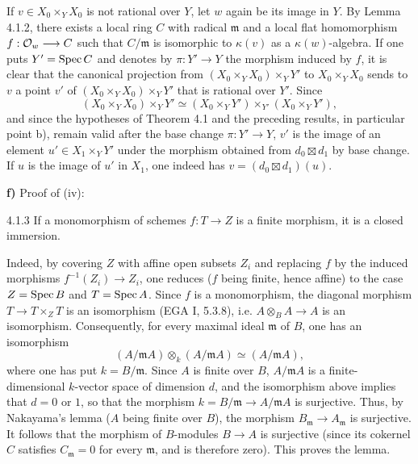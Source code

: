 If $v\in X_0\times_YX_0$ is not rational over $Y$, let $w$ again be its image in $Y$. By Lemma 4.1.2, there exists a local ring $C$ with radical $\mathfrak m$ and a local flat homomorphism $f:\mathcal{O}_w\longrightarrow C$ such that $C/\mathfrak m$ is isomorphic to $\kappa(v)$ as a $\kappa(w)$-algebra. If one puts $Y'=\operatorname{Spec} C$ and denotes by $\pi:Y'\to Y$ the morphism induced by $f$, it is clear that the canonical projection from $(X_0\times_YX_0)\times_YY'$ to $X_0\times_YX_0$ sends to $v$ a point $v'$ of $(X_0\times_YX_0)\times_YY'$ that is rational over $Y'$. Since
\[
(X_0\times_YX_0)\times_YY'\simeq(X_0\times_YY')\times_{Y'}(X_0\times_YY'),
\]
and since the hypotheses of Theorem 4.1 and the preceding results, in particular point b), remain valid after the base change $\pi:Y'\to Y$, $v'$ is the image of an element $u'\in X_1\times_YY'$ under the morphism obtained from $d_0\boxtimes d_1$ by base change. If $u$ is the image of $u'$ in $X_1$, one indeed has $v=(d_0\boxtimes d_1)(u)$.

\textbf{f)} Proof of (iv):
\begin{lemma}{4.1.3}\label{V.4.1.3}
If a monomorphism of schemes $f:T\to Z$ is a finite morphism, it is a closed immersion.
\end{lemma}
Indeed, by covering $Z$ with affine open subsets $Z_i$ and replacing $f$ by the induced morphisms $f^{-1}(Z_i)\to Z_i$, one reduces ($f$ being finite, hence affine) to the case $Z=\operatorname{Spec} B$ and $T=\operatorname{Spec} A$.
Since $f$ is a monomorphism, the diagonal morphism $T\to T\times_ZT$ is an isomorphism (EGA I, 5.3.8), i.e. $A\otimes_BA\to A$ is an isomorphism. Consequently, for every maximal ideal $\mathfrak m$ of $B$, one has an isomorphism
\[
(A/\mathfrak mA)\otimes_k(A/\mathfrak mA)\simeq(A/\mathfrak mA),
\]
where one has put $k=B/\mathfrak m$. Since $A$ is finite over $B$, $A/\mathfrak mA$ is a finite-dimensional $k$-vector space of dimension $d$, and the isomorphism above implies that $d=0$ or $1$, so that the morphism $k=B/\mathfrak m\to A/\mathfrak mA$ is surjective.
Thus, by Nakayama's lemma ($A$ being finite over $B$), the morphism $B_{\mathfrak m}\to A_{\mathfrak m}$ is surjective. It follows that the morphism of $B$-modules $B\to A$ is surjective (since its cokernel $C$ satisfies $C_{\mathfrak m}=0$ for every $\mathfrak m$, and is therefore zero). This proves the lemma.

